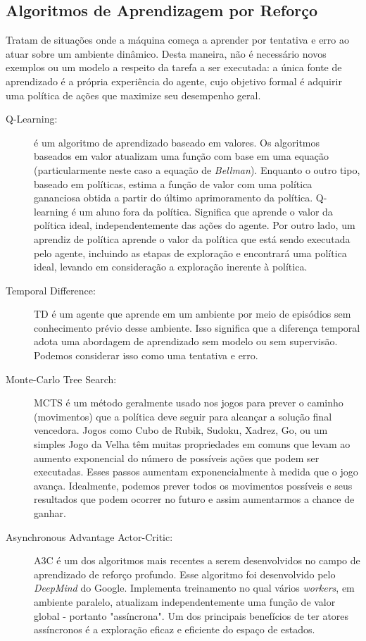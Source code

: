 \subsection{Algoritmos de Aprendizagem por Reforço}
Tratam de situações onde a máquina começa a aprender por tentativa e erro ao atuar sobre um ambiente dinâmico. Desta maneira, não é necessário novos exemplos ou um modelo a respeito da tarefa a ser executada: a única fonte de aprendizado é a própria experiência do agente, cujo objetivo formal é adquirir uma política de ações que maximize seu desempenho geral.
\begin{description}
	\item[Q-Learning:] é um algoritmo de aprendizado baseado em valores. Os algoritmos baseados em valor atualizam uma função com base em uma equação (particularmente neste caso a equação de \textit{Bellman}). Enquanto o outro tipo, baseado em políticas, estima a função de valor com uma política gananciosa obtida a partir do último aprimoramento da política. Q-learning é um aluno fora da política. Significa que aprende o valor da política ideal, independentemente das ações do agente. Por outro lado, um aprendiz de política aprende o valor da política que está sendo executada pelo agente, incluindo as etapas de exploração e encontrará uma política ideal, levando em consideração a exploração inerente à política.
	\item[Temporal Difference:] TD é um agente que aprende em um ambiente por meio de episódios sem conhecimento prévio desse ambiente. Isso significa que a diferença temporal adota uma abordagem de aprendizado sem modelo ou sem supervisão. Podemos considerar isso como uma tentativa e erro.
	\item[Monte-Carlo Tree Search:] MCTS é um método geralmente usado nos jogos para prever o caminho (movimentos) que a política deve seguir para alcançar a solução final vencedora. Jogos como Cubo de Rubik, Sudoku, Xadrez, Go, ou um simples Jogo da Velha têm muitas propriedades em comuns que levam ao aumento exponencial do número de possíveis ações que podem ser executadas. Esses passos aumentam exponencialmente à medida que o jogo avança. Idealmente, podemos prever todos os movimentos possíveis e seus resultados que podem ocorrer no futuro e assim aumentarmos a chance de ganhar.
	\item[Asynchronous Advantage Actor-Critic:] A3C é um dos algoritmos mais recentes a serem desenvolvidos no campo de aprendizado de reforço profundo. Esse algoritmo foi desenvolvido pelo \textit{DeepMind} do Google. Implementa treinamento no qual vários \textit{workers}, em ambiente paralelo, atualizam independentemente uma função de valor global - portanto "assíncrona". Um dos principais benefícios de ter atores assíncronos é a exploração eficaz e eficiente do espaço de estados.
\end{description}

